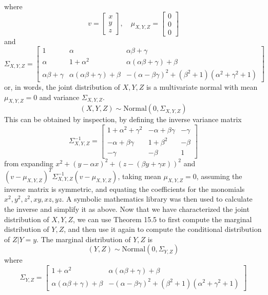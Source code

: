 where
\[
v = 
\begin{bmatrix}
x \\ y \\ z
\end{bmatrix},
\quad \mu_{X, Y, Z} = 
\begin{bmatrix}
0 \\ 0 \\ 0
\end{bmatrix}
\]
and
\[
\Sigma_{X, Y, Z} = \begin{bmatrix}
1 & \alpha & \alpha \beta + \gamma\\
\alpha & 1 + \alpha^{2} & \alpha(\alpha \beta + \gamma) + \beta \\
\alpha \beta + \gamma & \alpha(\alpha \beta + \gamma) + \beta & -(\alpha - \beta\gamma)^{2} + (\beta^{2} + 1)(\alpha^{2} + \gamma^{2} + 1)
\end{bmatrix}
\]
or, in words, the joint distribution of \(X, Y, Z\) is a multivariate
normal with mean \(\mu_{X, Y, Z} = 0\) and variance
\(\Sigma_{X, Y, Z}\).
\[
(X, Y, Z) \sim \text{Normal}(0, \Sigma_{X, Y, Z})
\]
This can be obtained by inspection, by defining the inverse variance
matrix
\[
\Sigma_{X, Y, Z}^{-1} = \begin{bmatrix}
1 + \alpha^{2} + \gamma^{2} & -\alpha + \beta \gamma & -\gamma \\
-\alpha + \beta \gamma  & 1 + \beta^{2}            & -\beta  \\
-\gamma                 & -\beta                 & 1
\end{bmatrix}
\]
from expanding \(x^{2} + (y - \alpha x)^{2} + (z - (\beta y + \gamma x))^{2}\)
and \((v - \mu_{X, Y, Z})^T \Sigma_{X, Y, Z}^{-1} (v - \mu_{X, Y, Z})\),
taking mean \(\mu_{X, Y, Z} = 0\), assuming the inverse matrix is
symmetric, and equating the coefficients for the monomials
\(x^{2}, y^{2}, z^{2}, xy, xz, yz\). A symbolic mathematics library was then
used to calculate the inverse and simplify it as above.
Now that we have characterized the joint distribution of \(X, Y, Z\), we
can use Theorem 15.5 to first compute the marginal distribution of
\(Y, Z\), and then use it again to compute the conditional distribution
of \(Z | Y = y\).
The marginal distribution of \(Y, Z\) is
\[
(Y, Z) \sim \text{Normal}(0, \Sigma_{Y, Z})
\]
where
\[
\Sigma_{Y, Z} = 
\begin{bmatrix}
1 + \alpha^{2} & \alpha(\alpha \beta + \gamma) + \beta \\
\alpha(\alpha \beta + \gamma) + \beta & -(\alpha - \beta\gamma)^{2} + (\beta^{2} + 1)(\alpha^{2} + \gamma^{2} + 1)
\end{bmatrix}
\]
